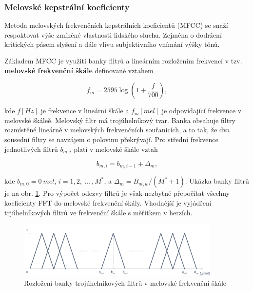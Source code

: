 \subsubsection{Melovské kepstrální koeficienty}

Metoda melovských frekvenčních kepstrálních koeficientů (MFCC) se snaží respoktovat výše zmíněné vlastnosti lidského sluchu. Zejména o dodržení kritických pásem slyšení a dále vlivu subjektivního vnímání výšky tónů.

Základem MFCC je využití banky filtrů a lineárním rozložením frekvencí v tzv. \textbf{melovské frekvenční škále} definované vztahem

\begin{equation}
  f_m = 2595 \log \left(1 + \frac{f}{700}\right),
  \label{eq:asr:mfcc:melscale}
\end{equation}

\noindent kde $f \left[Hz\right]$ je frekvence v lineární škále a $f_m \left[mel\right]$ je odpovídající frekvence v melovské škáleě. Melovský filtr má trojúhelníkový tvar. Banka obsahuje filtry rozmístěné lineárně v melovských frekvenčních souřanicích, a to tak, že dva sousední filtry se navzájem o polovinu překrývají. Pro střední frekvence jednotlivých filtrů $b_{m,i}$ platí v melovské škále vztah

\begin{equation}
  b_{m,i} = b_{m,i-1} + \Delta_{m},
  \label{eq:asr:mfcc:freq}
\end{equation}

\noindent kde $b_{m, 0} = 0\ mel$, $i = 1, 2,\ \dots\ , M^{*}$, a $\Delta_m = B_{m,w} / (M^{*} + 1)$. Ukázka banky filtrů je na obr. \ref{fig:asr:mfcc:bank:mel}. Pro výpočet odezvy filtrů je však nezbytné přepočítat všechny koeficienty FFT do melovské frekvenční škály. Vhodnější je vyjádření trjúhelníkových filtrů ve frekvenční škále s měřítkem v herzích.

\begin{figure}[hbpt]
  \centering
  \includegraphics[width=0.9\textwidth]{./ch4-asr/img/filter_bank-mel.pdf}
  \caption{Rozložení banky trojúhelníkových filtrů v melovské frekvenční škále}
  \label{fig:asr:mfcc:bank:mel}
\end{figure}

